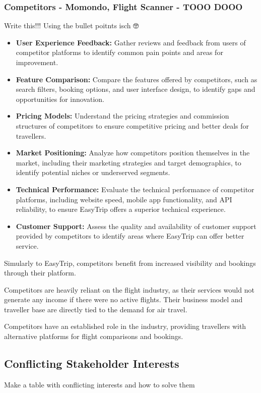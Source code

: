 \subsubsection{Competitors - Momondo, Flight Scanner - TOOO DOOO 💩}
Write this!!! Using the bullet poitnts isch 🤓
\begin{itemize}
    \item \textbf{User Experience Feedback:} Gather reviews and feedback from users of competitor platforms to identify common pain points and areas for improvement.
    \item \textbf{Feature Comparison:} Compare the features offered by competitors, such as search filters, booking options, and user interface design, to identify gaps and opportunities for innovation.
    \item \textbf{Pricing Models:} Understand the pricing strategies and commission structures of competitors to ensure competitive pricing and better deals for travellers.
    \item \textbf{Market Positioning:} Analyze how competitors position themselves in the market, including their marketing strategies and target demographics, to identify potential niches or underserved segments.
    \item \textbf{Technical Performance:} Evaluate the technical performance of competitor platforms, including website speed, mobile app functionality, and API reliability, to ensure EasyTrip offers a superior technical experience.
    \item \textbf{Customer Support:} Assess the quality and availability of customer support provided by competitors to identify areas where EasyTrip can offer better service.
\end{itemize}

Simularly to EasyTrip, competitors benefit from increased visibility and bookings through their platform. 

Competitors are heavily reliant on the flight industry, as their services would not generate any income if there were no active flights. Their business model and traveller base are directly tied to the demand for air travel.


Competitors have an established role in the industry, providing travellers with alternative platforms for flight comparisons and bookings. 

\subsection{Conflicting Stakeholder Interests}
Make a table with conflicting interests and how to solve them

